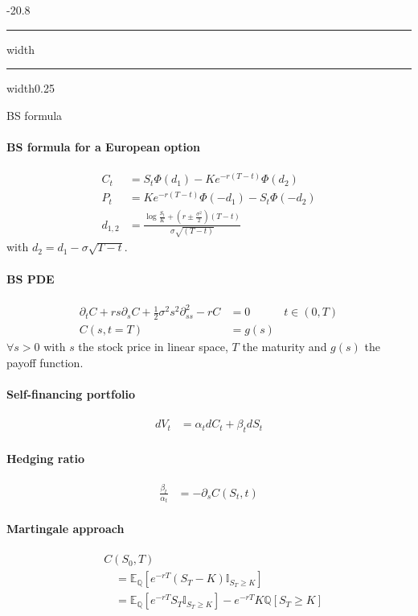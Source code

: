 \documentclass[a4paper,landscape,8pt,fleqn]{scrartcl}
\makeatletter
\renewcommand{\subsection}{\@startsection{subsection}{1}{0mm}%
{-2\baselineskip}{0.8\baselineskip}%
{\hrule depth 0.2pt width\columnwidth\hrule depth0.75pt
width0.25\columnwidth\vspace*{1.2em}\large\bfseries}}
\makeatother
\begin{document}
\begin{multicols*}{4}
\subsection{BS formula}

\paragraph{BS formula for a European option}
\begin{align*}
C_t &= S_t \Phi (d_1) - K e^{-r(T-t)} \Phi (d_2) \\
P_t &= K e^{-r(T-t)} \Phi (-d_1) - S_t \Phi (-d_2) \\
d_{1,2} &= \frac{\log \frac{S_t}{K} + (r \pm \frac{\sigma^2}{2})(T-t)}{\sigma \sqrt{(T-t)}}
\end{align*}
with $d_2 = d_1 -\sigma \sqrt{T-t}$.

\paragraph{BS PDE}
\begin{align*}
\partial_t C + r s \partial_s C + \frac{1}{2} \sigma^2 s^2 \partial^2_{ss} - r C &= 0 & t \in (0,T) \\
C(s,t=T) &= g(s)
\end{align*}
$\forall s > 0$ with $s$ the stock price in linear space, $T$ the maturity and $g(s)$ the payoff function.

\paragraph{Self-financing portfolio}
\begin{align*}
dV_t &= \alpha_t dC_t + \beta_t dS_t
\end{align*}

\paragraph{Hedging ratio}
\begin{align*}
\frac{\beta_t}{\alpha_t} &= -\partial_s C(S_t,t)
\end{align*}

\paragraph{Martingale approach}
\begin{align*}
&C(S_0,T) \\
&\quad = \mathbb{E}_\mathbb{Q} \left[ e^{-r T} (S_T - K) \mathbb{I}_{S_T \geq K} \right] \\
&\quad = \mathbb{E}_\mathbb{Q} \left[ e^{-r T} S_T \mathbb{I}_{S_T \geq K} \right] - e^{-r T} K \mathbb{Q} \left[ S_T \geq K \right]
\end{align*}


\end{multicols*}
\end{document}

